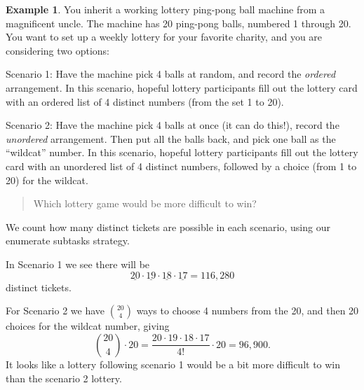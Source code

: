 \documentclass[
]{book}
\theoremstyle{definition}
\theoremstyle{definition}
\newtheorem{example}{Example}[chapter]
\theoremstyle{definition}
\theoremstyle{definition}
\theoremstyle{remark}
\begin{document}
\begin{example}
\protect\hypertarget{exm:lottery-balls}{}\label{exm:lottery-balls}You inherit a working lottery ping-pong ball machine from a magnificent uncle. The machine has 20 ping-pong balls, numbered 1 through 20. You want to set up a weekly lottery for your favorite charity, and you are considering two options:

Scenario 1: Have the machine pick 4 balls at random, and record the \emph{ordered} arrangement. In this scenario, hopeful lottery participants fill out the lottery card with an ordered list of 4 distinct numbers (from the set 1 to 20).

Scenario 2: Have the machine pick 4 balls at once (it can do this!), record the \emph{unordered} arrangement. Then put all the balls back, and pick one ball as the ``wildcat'' number. In this scenario, hopeful lottery participants fill out the lottery card with an unordered list of 4 distinct numbers, followed by a choice (from 1 to 20) for the wildcat.

\begin{quote}
Which lottery game would be more difficult to win?
\end{quote}

We count how many distinct tickets are possible in each scenario, using our enumerate subtasks strategy.

In Scenario 1 we see there will be
\[\underline{20} \cdot \underline{19} \cdot \underline{18} \cdot \underline{17} = 116,280\] distinct tickets.

For Scenario 2 we have \(\binom{20}{4}\) ways to choose 4 numbers from the 20, and then 20 choices for the wildcat number, giving
\[\binom{20}{4}\cdot 20 = \frac{20\cdot 19 \cdot 18 \cdot 17}{4!}\cdot 20 = 96,900.\]
It looks like a lottery following scenario 1 would be a bit more difficult to win than the scenario 2 lottery.
\end{example}
\end{document}
